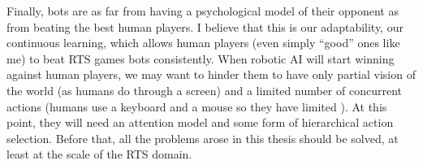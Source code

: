 Finally, bots are as far from having a psychological model of their opponent as from beating the best human players. I believe that this is our adaptability, our continuous learning, which allows human players (even simply ``good'' ones like me) to beat RTS games bots consistently. When robotic AI will start winning against human players, we may want to hinder them to have only partial vision of the world (as humans do through a screen) and a limited number of concurrent actions (humans use a keyboard and a mouse so they have limited ). At this point, they will need an attention model and some form of hierarchical action selection. Before that, all the problems arose in this thesis should be solved, at least at the scale of the RTS domain.







